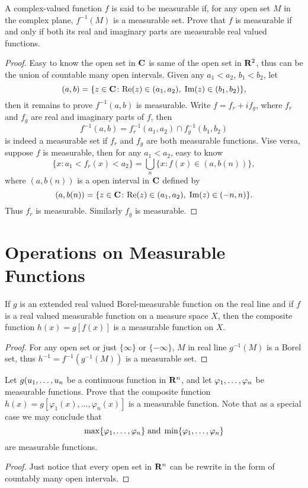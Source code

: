 \begin{pro}%
	A complex-valued function $f$ is said to be measurable if, for any open set $M$ in the complex plane, $f^{-1}(M)$ is a measurable set. Prove that $f$ is measurable if and only if both its real and imaginary parts are measurable real valued functions.
\end{pro}
\begin{proof}
	Easy to know the open set in $\mathbf{C}$ is same of the open set in $\mathbf{R}^2$, thus can be the union of countable many open intervals.
	Given any $a_1<a_2$, $b_1<b_2$, let
	\[(a,b)=\{z\in\mathbf{C}\colon \mbox{Re}(z)\in(a_1,a_2),\;\mbox{Im}(z)\in(b_1,b_2)\},\]
	then it remains to prove $f^{-1}(a,b)$ is measurable.
	Write $f=f_r+if_g$, where $f_r$ and $f_g$ are real and imaginary parts of $f$, then
	\[f^{-1}(a,b)=f_r^{-1}(a_1,a_2)\cap f_g^{-1}(b_1,b_2)\] is indeed a measurable set if $f_r$ and $f_g$ are both measurable functions. Vise versa, suppose $f$ is measurable, then for any $a_1<a_2$, easy to know
	\[\{x\colon a_1<f_r(x)<a_2\}=\bigcup_n \{x\colon f(x)\in (a,b(n))\},\]
	where $(a,b(n))$ is a open interval in $\mathbf{C}$ defined by
	\[(a,b(n))=\{z\in\mathbf{C}\colon \mbox{Re}(z)\in(a_1,a_2),\;\mbox{Im}(z)\in(-n,n)\}.\]
	Thus $f_r$ is measurable. Similarly $f_g$ is measurable.
\end{proof}

\section{Operations on Measurable Functions}
\begin{pro}%
	If $g$ is an extended real valued Borel-measurable function on the real line and if $f$ is a real valued measurable function on a measure space $X$, then the composite function $h(x)=g[f(x)]$ is a measurable function on $X$.
\end{pro}
\begin{proof}
	 For any open set or just $\{\infty\}$ or $\{-\infty\}$, $M$ in real line $g^{-1}(M)$ is a Borel set, thus $h^{-1}=f^{-1}(g^{-1}(M))$ is a measurable set.
\end{proof}

\begin{pro}%
	Let $g(u_1,\ldots,u_n$ be a continuous function in $\mathbf{R}^n$, and let $\varphi_1,\ldots,\varphi_n$ be measurable functions. Prove that the composite function $h(x)=g[\varphi_1(x),\ldots,\varphi_n(x)]$ is a measurable function. Note that as a special case we may conclude that
	\[\max\{\varphi_1,\ldots,\varphi_n\}\;\mbox{and}\;\min\{\varphi_1,\ldots,\varphi_n\}\]
	are measurable functions.
\end{pro}
\begin{proof}
	Just notice that every open set in $\mathbf{R}^n$ can be rewrite in the form of countably many open intervals.
\end{proof}

